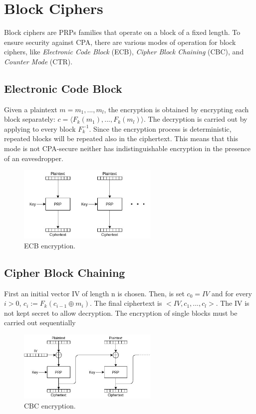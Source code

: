\section{Block Ciphers}
\par
Block ciphers are PRPs families that operate on a block of a fixed length. To ensure security against CPA, there are various modes of operation for block ciphers, like \emph{Electronic Code Block} (ECB), \emph{Cipher Block Chaining} (CBC), and \emph{Counter Mode} (CTR).

\subsection{Electronic Code Block}
\par
Given a plaintext $m = m_1,...,m_l$, the encryption is obtained by encrypting each block separately: $c = \langle F_k(m_1),...,F_k(m_l) \rangle$.
The decryption is carried out by applying to every block $F_k^{-1}$. Since the encryption process is deterministic, repeated blocks will be repeated also in the ciphertext. This means that this mode is not CPA-secure neither has indistinguishable encryption in the presence of an eavesdropper.
\begin{figure}[H]
    \centering
    \includegraphics[width=0.6\textwidth]{img/private-key/ecb.jpg}
    \caption[ECB encryption]{ECB encryption.}
\end{figure}

\subsection{Cipher Block Chaining}
\par
First an initial vector IV of length n is chosen. Then, is set $c_0 = IV$ and for every $i > 0$, $c_i := F_k(c_{i-1} \oplus m_i)$. The final ciphertext is $<IV,c_1,...,c_l>$. The IV is not kept secret to allow decryption. The encryption of single blocks must be carried out sequentially
\begin{figure}[H]
    \centering
    \includegraphics[width=0.6\textwidth]{img/private-key/cbc.jpg}
    \caption[CBC encryption]{CBC encryption.}
\end{figure}

